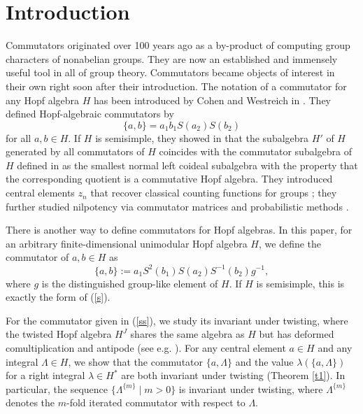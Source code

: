 \documentclass[11pt]{amsart}
\numberwithin{equation}{section}
\begin{document}
\section{\bf Introduction}
Commutators originated over 100 years ago as a by-product of computing group characters of nonabelian groups. They are now an established and immensely useful
tool in all of group theory. Commutators became objects of interest in their own right soon after their introduction. 
The notation of a commutator for any Hopf algebra $H$ has been introduced by Cohen and Westreich in \cite{Cohen}. They defined Hopf-algebraic commutators by \begin{equation}\label{s}\{a,b\}= a_1b_1S(a_2)S(b_2) \end{equation} for all $a,b\in H$. If $H$ is semisimple, they showed in  \cite[Proposition 2.2]{Cohen} that the subalgebra $H'$ of $H$ generated by all commutators of $H$ coincides with the commutator subalgebra of $H$ defined in \cite{Bur} as the smallest normal left coideal subalgebra with the property that the corresponding quotient is a commutative Hopf algebra. They introduced central elements $z_n$ that recover classical counting functions for groups \cite{Cohen}; they further studied nilpotency via commutator matrices and probabilistic methods \cite{CW}. 

There is another way to define commutators for Hopf algebras. In this paper, for an arbitrary finite-dimensional unimodular Hopf algebra $H$, we define the commutator of $a,b\in H$ as
\begin{equation}\label{ss}
\{a,b\}:=a_1S^2(b_1)S(a_2)S^{-1}(b_2)g^{-1},
\end{equation}
where $g$ is the distinguished group-like element of $H$. If $H$ is semisimple, this is exactly the form of (\ref{s}). 

For the commutator given in (\ref{ss}), we study its invariant under twisting, where the twisted Hopf algebra $H^J$ shares the same algebra as $H$ but has deformed comultiplication and antipode (see e.g. \cite{AEGN, Drin}). For any central element $a\in H$ and any integral $\Lambda\in H$, we show that the commutator $\{a,\Lambda\}$ and the value $\lambda(\{a,\Lambda\})$ for a right integral $\lambda\in H^*$ are both invariant under twisting (Theorem \ref{t1}). In particular, the sequence $\{\Lambda^{\{m\}}\mid m>0\}$ is invariant under twisting, where  $\Lambda^{\{m\}}$ denotes the $m$-fold iterated commutator with respect to $\Lambda$. 
\end{document}
